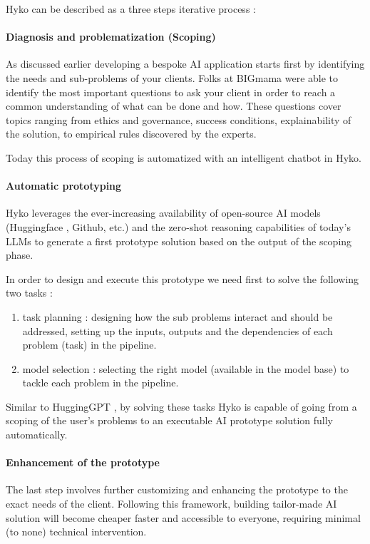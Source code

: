 \documentclass[a4paper,12pt]{article}
\begin{document}
Hyko can be described as a three steps iterative process :

\paragraph{Diagnosis and problematization (Scoping)}
As discussed earlier developing a bespoke AI application starts first by identifying the needs and sub-problems of your clients. 
Folks at BIGmama were able to identify the most important questions to ask your client in order to reach a common understanding of what can be done and how.
These questions cover topics ranging from ethics and governance, success conditions, explainability of the solution, to empirical rules discovered by the experts.

Today this process of scoping is automatized with an intelligent chatbot in Hyko. 

\paragraph{Automatic prototyping}
Hyko leverages the ever-increasing availability of open-source AI models (Huggingface \cite{huggingface}, Github, etc.)
and the zero-shot reasoning capabilities \cite{zeroshot} of today's LLMs to generate a first prototype solution based on the output of the scoping phase.  

In order to design and execute this prototype we need first to solve the following two tasks : 

\begin{enumerate}
	\item task planning : designing how the sub problems interact and should be addressed, setting up the inputs, outputs and the dependencies of each problem (task) in the pipeline.
	\item model selection : selecting the right model (available in the model base) to tackle each problem in the pipeline.
\end{enumerate}

Similar to HuggingGPT \cite{hugginggpt}, by solving these tasks Hyko is capable of going from a scoping of the user's problems to 
an executable AI prototype solution fully automatically.


\paragraph{Enhancement of the prototype}
The last step involves further customizing and enhancing the prototype to the exact needs of the client.
Following this framework, building tailor-made AI solution will become cheaper faster and accessible to everyone, requiring minimal (to none) technical intervention.
\end{document}
